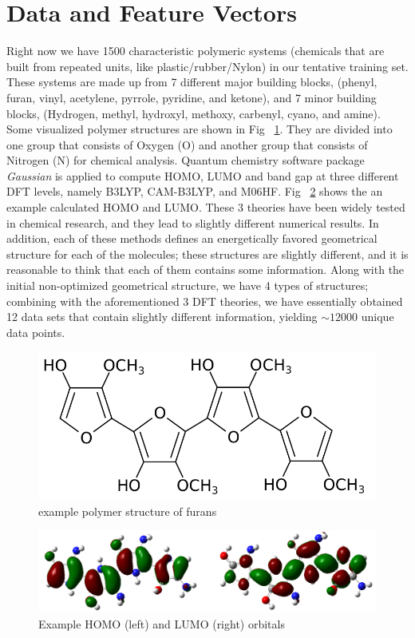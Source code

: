\section{Data and Feature Vectors}


\noindent Right now we have 1500 characteristic polymeric systems (chemicals that are built from repeated units, like plastic/rubber/Nylon) in our tentative training set. These systems are made up from 7 different major building blocks, (phenyl, furan, vinyl, acetylene, pyrrole, pyridine, and ketone), and 7 minor building blocks, (Hydrogen, methyl, hydroxyl, methoxy, carbenyl, cyano, and amine). Some visualized polymer structures are shown in Fig ~\ref{furan}. They are divided into one group that consists of Oxygen (O) and another group that consists of Nitrogen (N) for chemical analysis. Quantum chemistry software package \textit{Gaussian} \cite{gaussian} is applied to compute HOMO, LUMO and band gap at three different DFT levels, namely B3LYP, CAM-B3LYP, and M06HF. Fig ~\ref{orbital} shows the an example calculated HOMO and LUMO. These 3 theories have been widely tested in chemical research, and they lead to slightly different numerical results. In addition, each of these methods defines an energetically favored geometrical structure for each of the molecules; these structures are slightly different, and it is reasonable to think that each of them contains some information. Along with the initial non-optimized geometrical structure, we have 4 types of structures; combining with the aforementioned 3 DFT theories, we have essentially obtained 12 data sets that contain slightly different information, yielding $\sim12000$ unique data points. \\

\begin{figure}[hb]
\begin{center}
\includegraphics [width=.1\textwidth]{furan.png}
\caption{example polymer structure of furans}\label{furan}
\end{center}
\end{figure}

\begin{figure}[hb]
\begin{center}
\includegraphics [width=1\textwidth]{orbital.png}
\caption{Example HOMO (left) and LUMO (right) orbitals}\label{orbital}
\end{center}
\end{figure}

